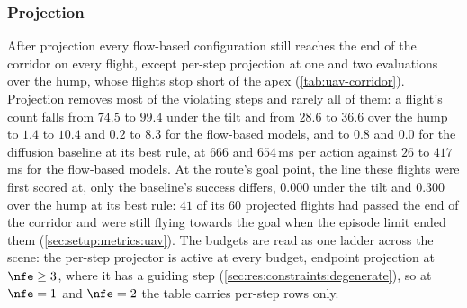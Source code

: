 \subsubsection{Projection}\label{sec:res:uav:projected}
After projection every flow-based configuration still reaches the end of the corridor on every flight,
except per-step projection at one and two evaluations over the hump, whose flights stop short of the apex
(\autoref{tab:uav-corridor}). Projection removes most of the violating steps and rarely all of them: a
flight's count falls from $74.5$ to $99.4$ under the tilt and from $28.6$ to $36.6$ over the hump to $1.4$
to $10.4$ and $0.2$ to $8.3$ for the flow-based models, and to $0.8$ and $0.0$ for the diffusion baseline
at its best rule, at $666$ and $654$\,ms per action against $26$ to $417$\,ms for the flow-based models.
At the route's goal point, the line these flights were first scored at, only the baseline's success
differs, $0.000$ under the tilt and $0.300$ over the hump at its best rule: $41$ of its $60$ projected
flights had passed the end of the corridor and were still flying towards the goal when the episode limit
ended them (\autoref{sec:setup:metrics:uav}). The budgets are read as one ladder across the scene: the
per-step projector is active at every budget, endpoint projection at $\nfe\ge 3$, where it has a guiding
step (\autoref{sec:res:constraints:degenerate}), so at $\nfe=1$ and $\nfe=2$ the table carries per-step
rows only.

